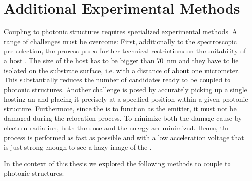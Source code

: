 	\section{Additional Experimental Methods} \label{sec::methods_coupling}

	Coupling \sivs to photonic structures requires specialized experimental methods.
	A range of challenges must be overcome:
	First, additionally to the spectroscopic pre-selection, the \pp process poses further technical restrictions on the suitability of a host \nd.
	The size of the host \nd has to be bigger than \SI{70}{nm} and they have to lie isolated on the substrate surface, i.e. with a distance of about one micrometer.
	This substantially reduces the number of \siv candidates ready to be coupled to photonic structures.
	Another challenge is posed by accurately picking up a single \nd hosting an \siv and placing it precisely at a specified position within a given photonic structure.
	Furthermore, since the \siv is to function as the \pl emitter, it must not be damaged during the relocation process.
	To minimize both the damage cause by electron radiation, both the dose and the energy are minimized.
	Hence, the \pp process is performed as fast as possible and with a low acceleration voltage that is just strong enough to see a hazy image of the \nd.


	In the context of this thesis we explored the following methods to couple \nds to photonic structures:

